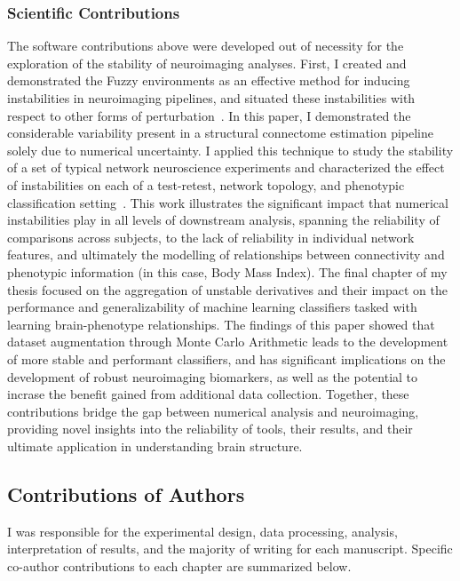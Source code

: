 \subsubsection*{Scientific Contributions}
The software contributions above were developed out of necessity for the exploration of the stability of neuroimaging
analyses. First, I created and demonstrated the Fuzzy environments as an effective method for inducing instabilities in
neuroimaging pipelines, and situated these instabilities with respect to other forms of
perturbation~\cite{Kiar2020-lb}. In this paper, I demonstrated the considerable variability present in a structural
connectome estimation pipeline solely due to numerical uncertainty. I applied this technique to study the stability of
a set of typical network neuroscience experiments and characterized the effect of instabilities on each of a
test-retest, network topology, and phenotypic classification setting~\cite{Kiar2020-kz}. This work illustrates the
significant impact that numerical instabilities play in all levels of downstream analysis, spanning the reliability of
comparisons across subjects, to the lack of reliability in individual network features, and ultimately the modelling of
relationships between connectivity and phenotypic information (in this case, Body Mass Index). The final chapter of my
thesis focused on the aggregation of unstable derivatives and their impact on the performance and generalizability of
machine learning classifiers tasked with learning brain-phenotype relationships. The findings of this paper showed that
dataset augmentation through Monte Carlo Arithmetic leads to the development of more stable and performant classifiers,
and has significant implications on the development of robust neuroimaging biomarkers, as well as the potential to
incrase the benefit gained from additional data collection. Together, these contributions bridge the gap between
numerical analysis and neuroimaging, providing novel insights into the reliability of tools, their results, and their
ultimate application in understanding brain structure.

\subsection{Contributions of Authors}
I was responsible for the experimental design, data processing, analysis, interpretation of results, and the majority
of writing for each manuscript. Specific co-author contributions to each chapter are summarized below.

